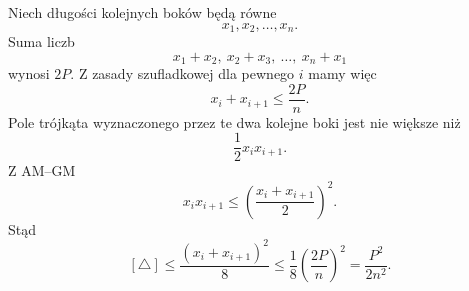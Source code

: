 \documentclass{lecture-kuznia}
\begin{document}
\begin{solution*}[\ref{Z17}]
	Niech długości kolejnych boków będą równe
	\[
		x_1,x_2,\dots,x_n.
	\]
	Suma liczb
	\[
		x_1+x_2,\ x_2+x_3,\ \dots,\ x_n+x_1
	\]
	wynosi $2P$. Z zasady szufladkowej dla pewnego $i$ mamy więc
	\[
		x_i+x_{i+1}\le\frac{2P}{n}.
	\]
	Pole trójkąta wyznaczonego przez te dwa kolejne boki jest nie większe niż
	\[
		\frac12x_ix_{i+1}.
	\]
	Z AM--GM
	\[
		x_ix_{i+1}
		\le
		\left(\frac{x_i+x_{i+1}}2\right)^2.
	\]
	Stąd
	\[
		[\triangle]
		\le
		\frac{(x_i+x_{i+1})^2}{8}
		\le
		\frac18\left(\frac{2P}{n}\right)^2
		=
		\frac{P^2}{2n^2}.
	\]
\end{solution*}










\fi
\end{document}
